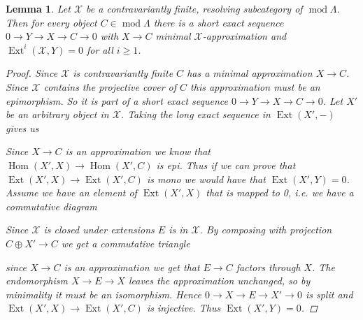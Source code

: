 \documentclass[11pt, a4paper, english]{article}
\newtheorem{lemma}[theorem]{Lemma}
\theoremstyle{definition}
\DeclareMathOperator{\Hom}{Hom}
\DeclareMathOperator{\Ext}{Ext}
\def\mod{\operatorname{mod}}
\begin{document}
\begin{lemma} \label{lem:exact_sequence_from_approximation}
	Let $\mathcal X$ be a contravariantly finite, resolving subcategory of $\mod \Lambda$. Then for every object $C \in \mod\Lambda$ there is a short exact sequence $0 \to Y \to X \to C \to 0$ with $X\to C$ minimal $\mathcal X$-approximation and $\Ext^i(\mathcal X, Y)=0$ for all $i \geq 1$.
	\begin{proof}
		Since $\mathcal X$ is contravariantly finite $C$ has a minimal approximation $X \to C$. Since $\mathcal X$ contains the projective cover of $C$ this approximation must be an epimorphism. So it is part of a short exact sequence $0 \to Y \to X \to C \to 0$. Let $X'$ be an arbitrary object in $\mathcal X$. Taking the long exact sequence in $\Ext(X', -)$ gives us
		\begin{center}
		\end{center}
		Since $X \to C$ is an approximation we know that $\Hom(X', X) \to \Hom(X', C)$ is epi. Thus if we can prove that $\Ext(X', X) \to \Ext(X', C)$ is mono we would have that $\Ext(X', Y)=0$. Assume we have an element of $\Ext(X', X)$ that is mapped to 0, i.e. we have a commutative diagram
		\begin{center}
		\end{center}
		Since $\mathcal X$ is closed under extensions $E$ is in $\mathcal X$. By composing with projection $C\oplus X' \to C$ we get a commutative triangle
		\begin{center}
		\end{center}
		since $X \to C$ is an approximation we get that $E \to C$ factors through $X$. The endomorphism $X \to E \to X$ leaves the approximation unchanged, so by minimality it must be an isomorphism. Hence $0 \to X \to E \to X' \to 0$ is split and $\Ext(X', X) \to \Ext(X', C)$ is injective. Thus $\Ext(X', Y)=0$.
	\end{proof}
\end{lemma}
\end{document}
